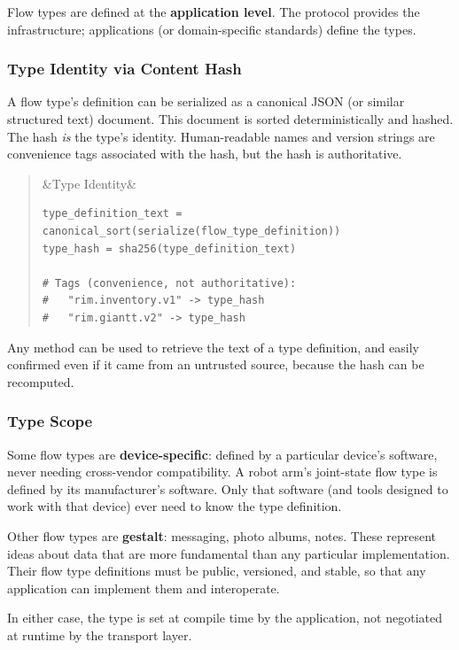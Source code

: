 \documentclass[11pt, letterpaper]{article}
\newenvironment{pseudocode}[1][]
  {\par\medskip\begin{quote}\small
   \ifx&#1&\else\noindent{\bfseries\color{rimblue} #1}\par\smallskip\fi
   \ttfamily}
  {\end{quote}\medskip}
\begin{document}
Flow types are defined at the \textbf{application level}. The protocol provides the
infrastructure; applications (or domain-specific standards) define the types.

\subsubsection{Type Identity via Content Hash}

A flow type's definition can be serialized as a canonical JSON (or similar structured
text) document. This document is sorted deterministically and hashed. The hash
\emph{is} the type's identity. Human-readable names and version strings are convenience
tags associated with the hash, but the hash is authoritative.

\begin{pseudocode}[Type Identity]
\begin{verbatim}
type_definition_text = canonical_sort(serialize(flow_type_definition))
type_hash = sha256(type_definition_text)

# Tags (convenience, not authoritative):
#   "rim.inventory.v1" -> type_hash
#   "rim.giantt.v2" -> type_hash
\end{verbatim}
\end{pseudocode}

Any method can be used to retrieve the text of a type definition, and easily confirmed
even if it came from an untrusted source, because the hash can be recomputed.

\subsubsection{Type Scope}

Some flow types are \textbf{device-specific}: defined by a particular device's software,
never needing cross-vendor compatibility. A robot arm's joint-state flow type is defined
by its manufacturer's software. Only that software (and tools designed to work with
that device) ever need to know the type definition.

Other flow types are \textbf{gestalt}: messaging, photo albums, notes. These represent
ideas about data that are more fundamental than any particular implementation. Their flow
type definitions must be public, versioned, and stable, so that any application can
implement them and interoperate.

In either case, the type is set at compile time by the application, not negotiated at
runtime by the transport layer.
\end{document}
